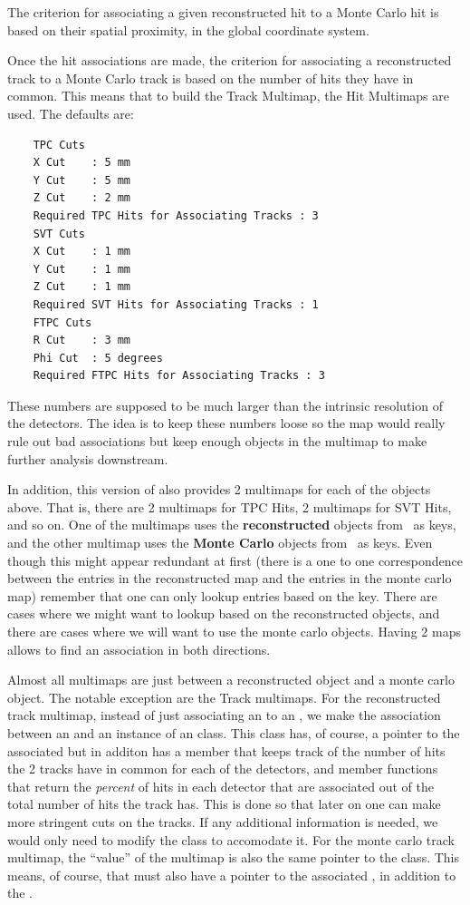 The criterion for associating a given reconstructed hit to a 
Monte Carlo hit is based on their spatial proximity, in the global coordinate system.

Once the hit associations are made, the criterion for associating a
reconstructed track to a Monte Carlo track is 
based on the number of hits they have in common.
This means that to build the Track Multimap, the Hit Multimaps are used.
    The defaults are:
\begin{verbatim}
    TPC Cuts
    X Cut    : 5 mm
    Y Cut    : 5 mm
    Z Cut    : 2 mm
    Required TPC Hits for Associating Tracks : 3
    SVT Cuts
    X Cut    : 1 mm
    Y Cut    : 1 mm
    Z Cut    : 1 mm
    Required SVT Hits for Associating Tracks : 1
    FTPC Cuts
    R Cut    : 3 mm
    Phi Cut  : 5 degrees
    Required FTPC Hits for Associating Tracks : 3
\end{verbatim}
These numbers are supposed to be much larger than the intrinsic resolution
of the detectors.  The idea is
to keep these numbers loose so the map would really rule out bad associations but keep
enough objects in the multimap to make further analysis downstream.

In addition, this version of \StAssociationMaker also provides 2 multimaps
for each of the objects above.  That is, there are 2 multimaps for
TPC Hits, 2 multimaps for SVT Hits, and so on.  One of the multimaps
uses the {\bf reconstructed} objects from \StEvent\ as keys, and the
other multimap uses the {\bf Monte Carlo} objects from \StMcEvent\ as
keys.  Even though this might appear redundant at first (there is a one to one correspondence
between the entries in the reconstructed map and the entries in the monte carlo map)
remember that one can only lookup entries based on the key.  There are cases where
we might want to lookup based on the reconstructed objects, and there are cases
where we will want to use the monte carlo objects.  Having 2 maps 
allows to find an association in both directions.

Almost all
multimaps are just between a reconstructed object and a monte carlo object.
The notable exception are the Track multimaps.
For the reconstructed track multimap, instead of just associating an
 to an , we make the association between an
 and an instance of an  class. 
This class has,
of course, a pointer to the associated  but in additon has a member that
keeps track of the number of hits the 2 tracks have in common for each of the
detectors, and member functions that return the {\it percent} of hits in each
detector that are associated out of the total number of hits the track has.
This is done so that
later on one can make more stringent cuts on the tracks.  If any additional information
is needed, we would only need to modify the  class to accomodate it.
For the monte carlo track multimap, the ``value'' of the multimap is also the same
pointer to the  class.
This means, of course, that 
must also have a pointer to the associated ,
in addition to the .


